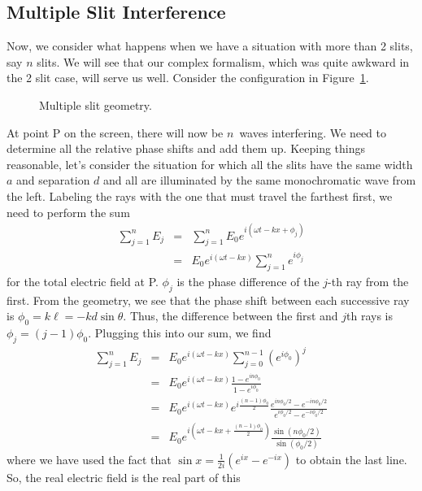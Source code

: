 \subsection{Multiple Slit Interference}

Now, we consider what happens when we have a situation with more than 2 slits, 
say $n$ slits. We will see that our complex formalism, which was quite awkward 
in the 2 slit case, will serve us well. Consider the configuration in 
Figure~\ref{fig:diff:n-slits}. 
\begin{figure}[htb]
\centerline{\epsfxsize=10cm }
\caption{Multiple slit geometry.}
\label{fig:diff:n-slits}
\end{figure}
At point P on the screen, there will now be 
$n$~waves interfering. We need to determine all the relative phase shifts and 
add them up. Keeping things reasonable, let's consider the situation for which 
all the slits have the same width $a$ and separation $d$ and all are 
illuminated by the same monochromatic wave from the left. Labeling the rays 
with the one that must travel the farthest first, we need to perform the sum
\begin{eqnarray*}
\sum^n_{j=1} E_j & = & \sum^n_{j=1} E_0 e^{i(\omega t - k x + \phi_j)}\\
                   & = & E_0 e^{i(\omega t - k x)} \sum^n_{j=1} e^{i\phi_j}
\end{eqnarray*}
for the total electric field at P. $\phi_j$ is the phase difference of the 
$j$-th ray from the first. From the geometry, we see that the phase shift 
between each successive ray is $\phi_0 = k \ell = -kd \sin \theta$. Thus, the 
difference between the first and $j$th rays is $\phi_j=(j-1)\phi_0$. Plugging 
this into our sum, we find
\begin{eqnarray*}
\sum^n_{j=1} E_j & = & E_0 e^{i(\omega t - k x)} \sum^{n-1}_{j=0} 
\left( e^{i\phi_0} \right)^j\\
& = & E_0 e^{i(\omega t - k x)} \frac{1-e^{in\phi_0}}{1-e^{i\phi_0}}\\
& = & E_0 e^{i(\omega t - k x)} e^{i\frac{(n-1)\phi_0}{2}}
      \frac{e^{in\phi_0/2}-e^{-in\phi_0/2}}{e^{i\phi_0/2}-e^{-i\phi_0/2}}\\
& = & E_0 e^{i\left(\omega t - k x + \frac{(n-1)\phi_0}{2}\right)}
       \frac{\sin (n\phi_0/2)}{\sin (\phi_0/2)}
\end{eqnarray*}
where we have used the fact that $\sin x = \frac{1}{2i}(e^{ix}-e^{-ix})$ to 
obtain the last line. So, the real electric field is the real part of this 

